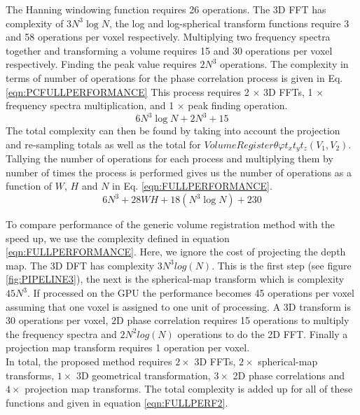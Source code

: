The Hanning windowing function requires 26 operations. The 3D FFT has complexity of $3N^3\log{N}$, the log and log-spherical transform functions require 3 and 58 operations per voxel respectively. Multiplying two frequency spectra together and transforming a volume requires 15 and 30 operations per voxel respectively. Finding the peak value requires $2N^3$ operations. The complexity in terms of number of operations for the phase correlation process is given in Eq. \ref{eqn:PCFULLPERFORMANCE} This process requires 2 $\times$ 3D FFTs, 1 $\times$ frequency spectra multiplication, and 1 $\times$ peak finding operation. 
\begin{equation} \label{eqn:PCFULLPERFORMANCE}
6N^3\log{N} + 2N^3 + 15
\end{equation}
The total complexity can then be found by taking into account the projection and re-sampling totals as well as the total for $VolumeRegister{\theta \varphi t_x t_y t_z}(V_1, V_2)$. Tallying the number of operations for each process and multiplying them by number of times the process is performed gives us the number of operations as a function of $W$, $H$ and $N$ in Eq. \ref{eqn:FULLPERFORMANCE}.
\begin{equation} \label{eqn:FULLPERFORMANCE}
6N^3 + 28WH + 18(N^3\log{N}) + 230
\end{equation}



To compare performance of the generic volume registration method with the speed up, we use the complexity defined in equation \ref{eqn:FULLPERFORMANCE}. Here, we ignore the cost of projecting the depth map. The 3D DFT has complexity $3N^3log(N)$. This is the first step (see figure \ref{fig:PIPELINE3}), the next is the spherical-map transform which is complexity $45N^3$. If processed on the GPU the performance becomes 45 operations per voxel assuming that one voxel is assigned to one unit of processing. A 3D transform is 30 operations per voxel, 2D phase correlation requires 15 operations to multiply the frequency spectra and $2N^2log(N)$ operations to do the 2D FFT. Finally a projection map transform requires 1 operation per voxel. \\

In total, the proposed method requires $2 \times$ 3D FFTs, $2 \times$ spherical-map transforms, $1 \times$ 3D geometrical transformation, $3 \times$ 2D phase correlations and $4 \times$ projection map transforms. The total complexity is added up for all of these functions and given in equation \ref{eqn:FULLPERF2}. \\

